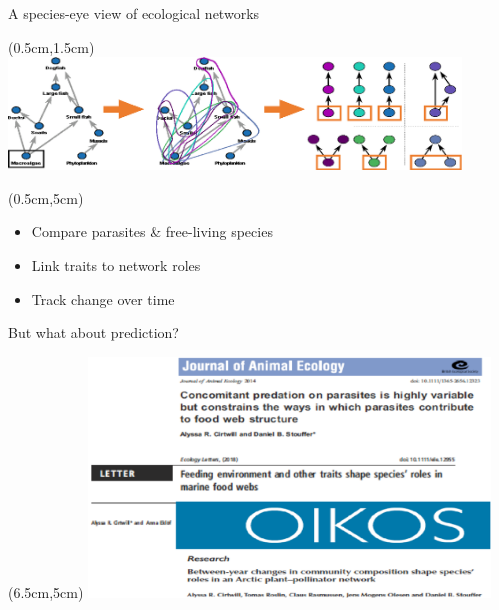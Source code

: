\documentclass{beamer}
\begin{document}
  \begin{frame}{A species-eye view of ecological networks}

    \begin{textblock*}{12cm}(0.5cm,1.5cm)
      \includegraphics[width=12cm]{intro_figs/role_breakdown.eps}
      \end{textblock*} 

    \begin{textblock*}{6cm}(0.5cm,5cm)
      \begin{itemize}
        \item Compare parasites \& free-living species
        \item Link traits to network roles
        \item Track change over time
      \end{itemize}

      \vspace{.5cm}
      {\color{white}But what about prediction?}

      \end{textblock*} 

    \begin{textblock*}{6cm}(6.5cm,5cm)
        \includegraphics[width=0.8\textwidth]{intro_figs/paperstack.eps}
      \end{textblock*} 

    \end{frame}
\end{document}
